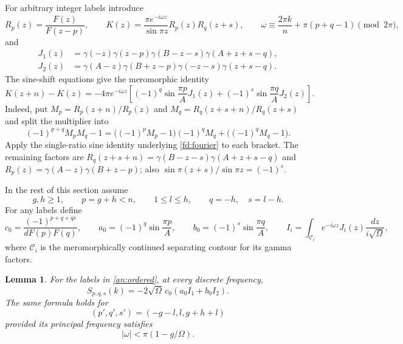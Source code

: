 \documentclass[11pt]{article}
\numberwithin{equation}{section}
\newtheorem{lemma}[theorem]{Lemma}
\theoremstyle{definition}
\theoremstyle{remark}
\begin{document}
For arbitrary integer labels introduce
\[
 R_p(z)=\frac{F(z)}{F(z-p)},\qquad
 K(z)=\frac{\pi e^{-i\omega z}}{\sin\pi z}R_p(z)R_q(z+s),\qquad
 \omega\equiv\frac{2\pi k}{n}+\pi(p+q-1)\pmod{2\pi},
\]
and
\begin{align*}
 J_1(z)&=\gamma(-z)\gamma(z-p)
                   \gamma(B-z-s)\gamma(A+z+s-q),\\
 J_2(z)&=\gamma(A-z)\gamma(B+z-p)
                   \gamma(-z-s)\gamma(z+s-q).
\end{align*}
The sine-shift equations give the meromorphic identity
\begin{equation}
 K(z+n)-K(z)=-4\pi e^{-i\omega z}
 \left[(-1)^q\sin\frac{\pi p}{A}J_1(z)
       +(-1)^s\sin\frac{\pi q}{A}J_2(z)\right].
 \label{an:two-ratio}
\end{equation}
Indeed, put $M_p=R_p(z+n)/R_p(z)$ and
$M_q=R_q(z+s+n)/R_q(z+s)$ and split the multiplier into
\[
 (-1)^{p+q}M_pM_q-1
 =\bigl((-1)^pM_p-1\bigr)(-1)^qM_q+
                                      \bigl((-1)^qM_q-1\bigr).
\]
Apply the single-ratio sine identity underlying \eqref{fd:fourier}
to each bracket.  The remaining factors are
$R_q(z+s+n)=\gamma(B-z-s)\gamma(A+z+s-q)$ and
$R_p(z)=\gamma(A-z)\gamma(B+z-p)$; also
$\sin\pi(z+s)/\sin\pi z=(-1)^s$.

In the rest of this section assume
\begin{equation}
 g,h\ge1,\qquad p=g+h<n,\qquad 1\le l\le h,
 \qquad q=-h,\quad s=l-h.
 \label{an:ordered}
\end{equation}
For any labels define
\[
 c_0=\frac{(-1)^{p+q+qs}}{dF(p)F(q)},\qquad
 a_0=(-1)^q\sin\frac{\pi p}{A},\qquad
 b_0=(-1)^s\sin\frac{\pi q}{A},\qquad
 I_i=\int_{\mathcal C_i}e^{-i\omega z}J_i(z)
                                    \frac{dz}{i\sqrt\Omega},
\]
where $\mathcal C_i$ is the meromorphically continued separating
contour for its gamma factors.

\begin{lemma}\label{an:product-formula}
For the labels in \eqref{an:ordered}, at every discrete frequency,
\begin{equation}
 S_{p,q,s}(k)=-2\sqrt\Omega\,c_0(a_0I_1+b_0I_2).
 \label{an:product}
\end{equation}
The same formula holds for
\[
 (p',q',s')=(-g-l,l,g+h+l)
\]
provided its principal frequency satisfies
\begin{equation}
 |\omega|<\pi(1-g/\Omega).
 \label{an:frequency}
\end{equation}
\end{lemma}
\end{document}

